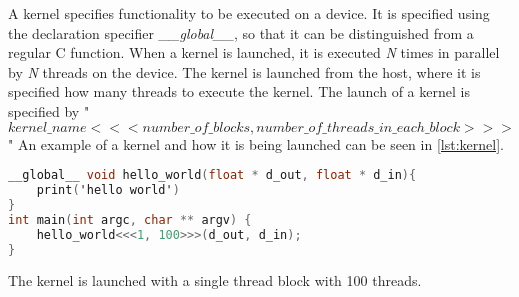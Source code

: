 A kernel specifies functionality to be executed on a device.
It is specified using the declaration specifier \textit{\_\_global\_\_}, so that it can be distinguished from a regular C function.
When a kernel is launched, it is executed \textit{N} times in parallel by \textit{N} threads on the device.
The kernel is launched from the host, where it is specified how many \cuda{} threads to execute the kernel.
The launch of a kernel is specified by "$kernel\_name<<< number\_of\_blocks, number\_of\_threads\_in\_each\_block >>>$"
An example of a kernel and how it is being launched can be seen in \autoref{lst:kernel}.
\begin{lstlisting}[language=C,caption={Kernel example},label=lst:kernel]
__global__ void hello_world(float * d_out, float * d_in){
	print('hello world')
}
int main(int argc, char ** argv) {
	hello_world<<<1, 100>>>(d_out, d_in);
}
\end{lstlisting}
The kernel is launched with a single thread block with 100 threads.